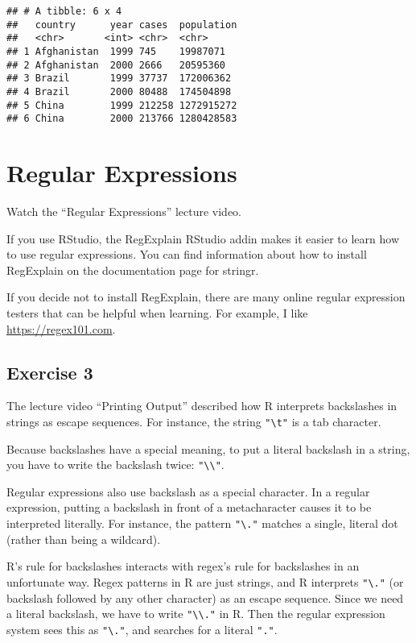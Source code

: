 \documentclass[
]{article}
\begin{document}
\begin{verbatim}
## # A tibble: 6 x 4
##   country      year cases  population
##   <chr>       <int> <chr>  <chr>     
## 1 Afghanistan  1999 745    19987071  
## 2 Afghanistan  2000 2666   20595360  
## 3 Brazil       1999 37737  172006362 
## 4 Brazil       2000 80488  174504898 
## 5 China        1999 212258 1272915272
## 6 China        2000 213766 1280428583
\end{verbatim}

\hypertarget{regular-expressions}{%
\section{Regular Expressions}\label{regular-expressions}}

Watch the ``Regular Expressions'' lecture video.

If you use RStudio, the RegExplain RStudio addin makes it easier to
learn how to use regular expressions. You can find information about how
to install RegExplain on the documentation page for stringr.

If you decide not to install RegExplain, there are many online regular
expression testers that can be helpful when learning. For example, I
like \url{https://regex101.com}.

\hypertarget{exercise-3}{%
\subsection{Exercise 3}\label{exercise-3}}

The lecture video ``Printing Output'' described how R interprets
backslashes in strings as escape sequences. For instance, the string
\texttt{"\textbackslash{}t"} is a tab character.

Because backslashes have a special meaning, to put a literal backslash
in a string, you have to write the backslash twice:
\texttt{"\textbackslash{}\textbackslash{}"}.

Regular expressions also use backslash as a special character. In a
regular expression, putting a backslash in front of a metacharacter
causes it to be interpreted literally. For instance, the pattern
\texttt{"\textbackslash{}."} matches a single, literal dot (rather than
being a wildcard).

R's rule for backslashes interacts with regex's rule for backslashes in
an unfortunate way. Regex patterns in R are just strings, and R
interprets \texttt{"\textbackslash{}."} (or backslash followed by any
other character) as an escape sequence. Since we need a literal
backslash, we have to write \texttt{"\textbackslash{}\textbackslash{}."}
in R. Then the regular expression system sees this as
\texttt{"\textbackslash{}."}, and searches for a literal \texttt{"."}.
\end{document}
